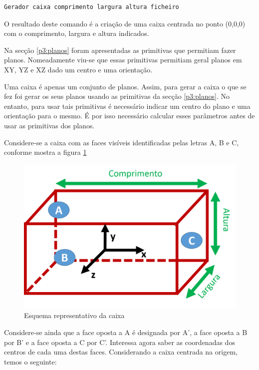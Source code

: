 \begin{Verbatim}
Gerador caixa comprimento largura altura ficheiro
\end{Verbatim}

O resultado deste comando é a criação de uma caixa centrada no ponto (0,0,0) com o comprimento, largura e altura indicados.

Na secção \ref{p3:planos} foram apresentadas as primitivas que permitiam fazer planos. Nomeadamente viu-se que essas primitivas permitiam geral planos em XY, YZ e XZ dado um centro e uma orientação.

Uma caixa é apenas um conjunto de planos. Assim, para gerar a caixa o que se fez foi gerar os seus planos usando as primitivas da secção \ref{p3:planos}. No entanto, para usar tais primitivas é necessário indicar um centro do plano e uma orientação para o mesmo. É por isso necessário calcular esses parâmetros antes de usar as primitivas dos planos.

Considere-se a caixa com as faces visíveis identificadas pelas letras A, B e C, conforme mostra a figura \ref{p1:fig:p3_Caixa}

\begin{figure}[<+htpb+>]
	\centering
	\includegraphics[scale=0.5]{imagens/p3_Caixa.png}
	\caption{Esquema representativo da caixa}
	\label{p1:fig:p3_Caixa}
\end{figure}

Considere-se ainda que a face oposta a A é designada por A', a face oposta a B por B' e a face oposta a C por C'.
Interessa agora saber as coordenadas dos centros de cada uma destas faces. Considerando a caixa centrada na origem, temos o seguinte:

